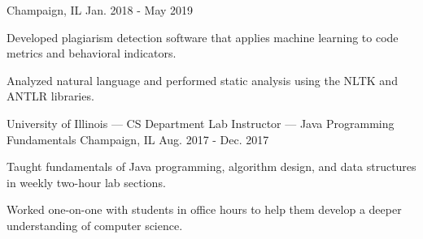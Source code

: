 \begin{cventries}
{Champaign, IL} %
{Jan. 2018 - May 2019} %
{
	\begin{cvitems} %
		\item {Developed plagiarism detection software that applies machine learning to code metrics and behavioral indicators.}
		\item {Analyzed natural language and performed static analysis using the NLTK and ANTLR libraries.}
	\end{cvitems}
}
\cventry
{University of Illinois — CS Department} %
{Lab Instructor — Java Programming Fundamentals} %
{Champaign, IL} %
{Aug. 2017 - Dec. 2017} %
{
	\begin{cvitems} %
		\item {Taught fundamentals of Java programming, algorithm design, and data structures in weekly two-hour lab sections.}
		\item {Worked one-on-one with students in office hours to help them develop a deeper understanding of computer science.}
	\end{cvitems}
}
\end{cventries}
